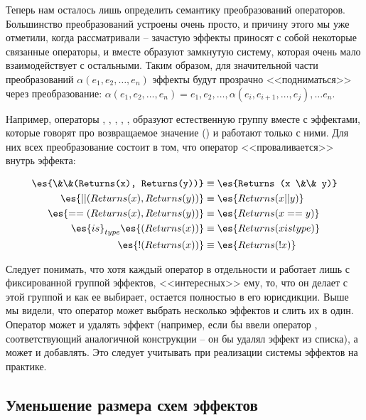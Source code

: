 Теперь нам осталось лишь определить семантику преобразований операторов. Большинство преобразований устроены очень просто, и причину этого мы уже отметили, когда рассматривали  -- зачастую эффекты приносят с собой некоторые связанные операторы, и вместе образуют замкнутую систему, которая очень мало взаимодействует с остальными. Таким образом, для значительной части преобразований $\alpha(e_1, e_2, \ldots, e_n)$ эффекты будут прозрачно <<подниматься>> через преобразование: $\alpha(e_1, e_2, \ldots, e_n) = e_1, e_2, \ldots, \alpha(e_i, e_{i + 1}, \ldots, e_j), \ldots e_n$.

Например, операторы \code{\&\&}, \code{||}, \code{==}, , \code{!},  образуют естественную группу вместе с эффектами, которые говорят про возвращаемое значение () и работают только с ними. Для них всех преобразование состоит в том, что оператор <<проваливается>> внутрь эффекта: 

\[
\begin{aligned}
	\es{\&\&(Returns(x), Returns(y))} & \equiv \es{Returns (x \&\& y)}    \\
	\es{||(Returns(x), Returns(y))}   & \equiv \es{Returns (x || y)}    \\
	\es{==(Returns(x), Returns(y))}   & \equiv \es{Returns (x == y)}    \\
	\es{is}_{type} \es{(Returns(x))}  & \equiv \es{Returns (x is type)} \\
	\es{!(Returns(x))} 				  & \equiv \es{Returns (!x)}
\end{aligned}
\]

Следует понимать, что хотя каждый оператор в отдельности и работает лишь с фиксированной группой эффектов, <<интересных>> ему, то, что он делает с этой группой и как ее выбирает, остается полностью в его юрисдикции. Выше мы видели, что оператор может выбрать несколько эффектов и слить их в один. Оператор может и удалять эффект (например, если бы ввели оператор , соответствующий аналогичной конструкции -- он бы удалял эффект  из списка), а может и добавлять. Это следует учитывать при реализации системы эффектов на практике.



\subsection{Уменьшение размера схем эффектов}

\label{section-schemas-reducing}

